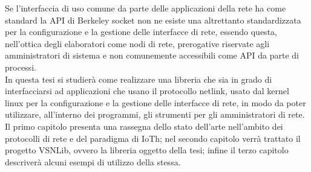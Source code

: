 Se l'interfaccia di uso comune da parte delle applicazioni della rete ha come standard la API di Berkeley socket non ne esiste una altrettanto standardizzata per la configurazione e la gestione delle interfacce di rete, essendo questa, nell'ottica degli elaboratori come nodi di rete, prerogative riservate agli amministratori di sistema e non comunemente accessibili come API da parte di processi.\\
In questa tesi si studier\`a come realizzare una libreria che sia in grado di interfacciarsi ad applicazioni che usano il protocollo netlink, usato dal kernel linux per la configurazione e la gestione delle interfacce di rete, in modo da poter utilizzare, all'interno dei programmi, gli strumenti per gli amministratori di rete.\\
Il primo capitolo presenta una rassegna dello stato dell'arte nell'ambito dei protocolli di rete e del paradigma di IoTh; nel secondo capitolo verr\`a trattato il progetto VSNLib, ovvero la libreria oggetto della tesi; infine il terzo capitolo descriver\`a alcuni esempi di utilizzo della stessa.
\clearpage{\pagestyle{empty}\cleardoublepage}
\tableofcontents                        %
\rhead[\fancyplain{}{\bfseries\leftmark}]{\fancyplain{}{\bfseries\thepage}}
\clearpage{\pagestyle{empty}\cleardoublepage}
\listoffigures                          %
\clearpage{\pagestyle{empty}\cleardoublepage}
\listoftables                           %
\clearpage{\pagestyle{empty}\cleardoublepage}

